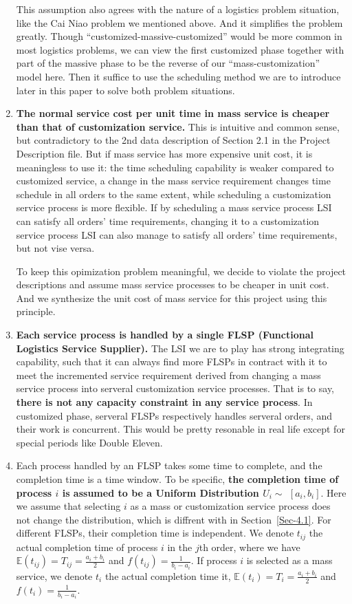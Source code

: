 \documentclass{llncs}
\begin{document}
\begin{enumerate}
    This assumption also agrees with the nature of a logistics problem situation, like the Cai Niao problem we mentioned above. And it simplifies the problem greatly. Though ``customized-massive-customized'' would be more common in most logistics problems, we can view the first customized phase together with part of the massive phase to be the reverse of our ``mass-customization'' model here. Then it suffice to use the scheduling method we are to introduce later in this paper to solve both problem situations.
    \item \textbf{The normal service cost per unit time in mass service is cheaper than that of customization service.} This is intuitive and common sense, but contradictory to the 2nd data description of Section 2.1 in the Project Description file. But if mass service has more expensive unit cost, it is meaningless to use it: the time scheduling capability is weaker compared to customized service, a change in the mass service requirement changes time schedule in all orders to the same extent, while scheduling a customization service process is more flexible. If by scheduling a mass service process LSI can satisfy all orders' time requirements, changing it to a customization service process LSI can also manage to satisfy all orders' time requirements, but not vise versa.
    
    To keep this opimization problem meaningful, we decide to violate the project descriptions and assume mass service processes to be cheaper in unit cost. And we synthesize the unit cost of mass service for this project using this principle.
    \item  \textbf{Each service process is handled by a single FLSP (Functional Logistics Service Supplier).} The LSI we are to play has strong integrating capability, such that it can always find more FLSPs in contract with it to meet the incremented service requirement derived from changing a mass service process into serveral customization service processes. That is to say, \textbf{there is not any capacity constraint in any service process}. In customized phase, serveral FLSPs respectively handles serveral orders, and their work is concurrent. This would be pretty resonable in real life except for special periods like Double Eleven.
    \item\label{ass-uniform} Each process handled by an FLSP takes some time to complete, and the completion time is a time window. To be specific, \textbf{the completion time of process $i$ is assumed to be a Uniform Distribution $U_i\sim$ $[a_i,b_i]$}. Here we assume that selecting $i$ as a mass or customization service process does not change the distribution, which is diffrent with in Section~\ref{Sec-4.1}. For different FLSPs, their completion time is independent. We denote $t_{ij}$ the actual completion time of process $i$ in the $j$th order, where we have $\mathbb{E}(t_{ij})=T_{ij}=\frac{a_i+b_i}{2}$ and $f(t_{ij})=\frac{1}{b_i-a_i}$. If process $i$ is selected as a mass service, we denote $t_{i}$ the actual completion time it, $\mathbb{E}(t_{i})=T_{i}=\frac{a_i+b_i}{2}$ and $f(t_{i})=\frac{1}{b_i-a_i}$.
    

\end{enumerate}
\end{document}
